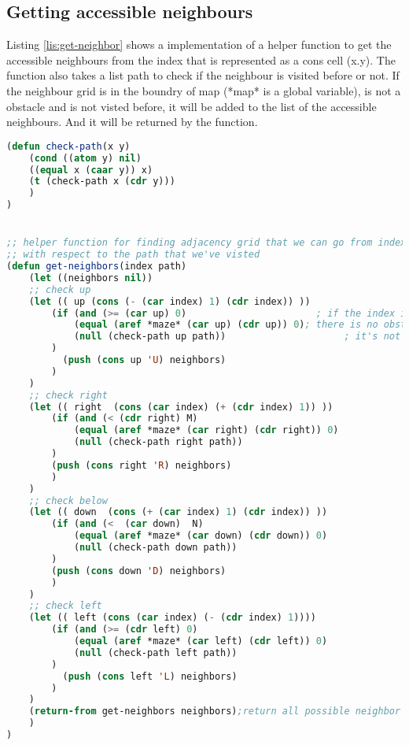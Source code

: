 \subsection{Getting accessible neighbours}
Listing \ref{lis:get-neighbor} shows a implementation of
a helper function to get the accessible neighbours from the index
that is represented as a cons cell (x.y). The function also takes
a list path to check if the neighbour is 
visited before or not. If the neighbour grid is in the boundry
of map (*map* is a global variable), is not a obstacle and is not visted before, it will be
added to the list of the accessible neighbours. And it will be 
returned by the function.


\begin{lstlisting}[language=Lisp, style=mystyle,
                 caption=Finding accessible neighbours from a specific point,
                 label=lis:get-neighbor]
(defun check-path(x y)
    (cond ((atom y) nil)
    ((equal x (caar y)) x)
    (t (check-path x (cdr y)))
    )
)


;; helper function for finding adjacency grid that we can go from index
;; with respect to the path that we've visted
(defun get-neighbors(index path)
    (let ((neighbors nil))
    ;; check up
    (let (( up (cons (- (car index) 1) (cdr index)) )) 
        (if (and (>= (car up) 0)                       ; if the index is in map
            (equal (aref *maze* (car up) (cdr up)) 0); there is no obstacle
            (null (check-path up path))                     ; it's not visited before
        )
          (push (cons up 'U) neighbors)
        )
    )
    ;; check right
    (let (( right  (cons (car index) (+ (cdr index) 1)) ))
        (if (and (< (cdr right) M)
            (equal (aref *maze* (car right) (cdr right)) 0)
            (null (check-path right path))
        )
        (push (cons right 'R) neighbors)
        )
    )
    ;; check below
    (let (( down  (cons (+ (car index) 1) (cdr index)) ))
        (if (and (<  (car down)  N)
            (equal (aref *maze* (car down) (cdr down)) 0)
            (null (check-path down path))
        )
        (push (cons down 'D) neighbors)
        )
    )
    ;; check left
    (let (( left (cons (car index) (- (cdr index) 1)))) 
        (if (and (>= (cdr left) 0) 
            (equal (aref *maze* (car left) (cdr left)) 0)
            (null (check-path left path))
        )
          (push (cons left 'L) neighbors)
        )
    )
    (return-from get-neighbors neighbors);return all possible neighbor accessible from index
    )
)
\end{lstlisting}

